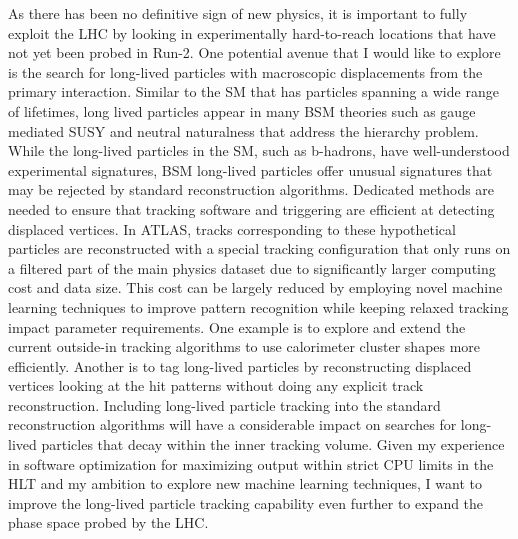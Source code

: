 \documentclass[a4paper]{article}
\begin{document}
\bigskip

As there has been no definitive sign of new physics, it is important to fully exploit the LHC by looking in experimentally hard-to-reach locations that have not yet been probed in Run-2. One potential avenue that I would like to explore is the search for long-lived particles with macroscopic displacements from the primary interaction. Similar to the SM that has particles spanning a wide range of lifetimes, long lived particles appear in many BSM theories such as gauge mediated SUSY and neutral naturalness that address the hierarchy problem\cite{alimena2019searching}. While the long-lived particles in the SM, such as b-hadrons, have well-understood experimental signatures, BSM long-lived particles offer unusual signatures that may be rejected by standard reconstruction algorithms. Dedicated methods are needed to ensure that tracking software and triggering are efficient at detecting displaced vertices. In ATLAS, tracks corresponding to these hypothetical particles are reconstructed with a special tracking configuration that only runs on a filtered part of the main physics dataset due to significantly larger computing cost and data size. This cost can be largely reduced by employing novel machine learning techniques to improve pattern recognition while keeping relaxed tracking impact parameter requirements. One example is to explore and extend the current outside-in tracking algorithms to use calorimeter cluster shapes more efficiently. Another is to tag long-lived particles by reconstructing displaced vertices looking at the hit patterns without doing any explicit track reconstruction. Including long-lived particle tracking into the standard reconstruction algorithms will have a considerable impact on searches for long-lived particles that decay within the inner tracking volume. Given my experience in software optimization for maximizing output within strict CPU limits in the HLT and my ambition to explore new machine learning techniques, I want to improve the long-lived particle tracking capability even further to expand the phase space probed by the LHC.

\bigskip
\end{document}
